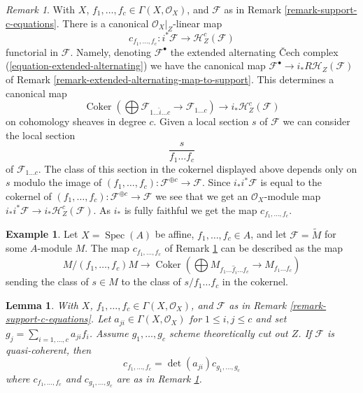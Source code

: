 \documentclass{stacks-project}
\theoremstyle{plain}
\newtheorem{lemma}[subsection]{Lemma}
\theoremstyle{definition}
\newtheorem{example}[subsection]{Example}
\theoremstyle{remark}
\newtheorem{remark}[subsection]{Remark}
\numberwithin{equation}{subsection}
\def\Spec{\mathop{\mathrm{Spec}}}
\def\Coker{\mathop{\mathrm{Coker}}}
\begin{document}
\begin{remark}
\label{remark-supported-map-c-equations}
With $X$, $f_1, \ldots, f_c \in \Gamma(X, \mathcal{O}_X)$, and
$\mathcal{F}$ as in Remark \ref{remark-support-c-equations}.
There is a canonical $\mathcal{O}_X|_Z$-linear map
$$
c_{f_1, \ldots, f_c} :
i^*\mathcal{F}
\longrightarrow
\mathcal{H}^c_Z(\mathcal{F})
$$
functorial in $\mathcal{F}$. Namely, denoting $\mathcal{F}^\bullet$ the
extended alternating {\v C}ech complex (\ref{equation-extended-alternating})
we have the canonical map
$\mathcal{F}^\bullet \to i_*R\mathcal{H}_Z(\mathcal{F})$
of Remark \ref{remark-extended-alternating-map-to-support}.
This determines a canonical map
$$
\Coker\left(\bigoplus \mathcal{F}_{1 \ldots \hat i \ldots c} \to
\mathcal{F}_{1 \ldots c}\right)
\longrightarrow
i_*\mathcal{H}^c_Z(\mathcal{F})
$$
on cohomology sheaves in degree $c$.
Given a local section $s$ of $\mathcal{F}$ we can consider the
local section
$$
\frac{s}{f_1 \ldots f_c}
$$
of $\mathcal{F}_{1 \ldots c}$. The class of this section in the cokernel
displayed above depends only on $s$ modulo the image of
$(f_1, \ldots, f_c) : \mathcal{F}^{\oplus c} \to \mathcal{F}$.
Since $i_*i^*\mathcal{F}$ is equal to the cokernel of
$(f_1, \ldots, f_c) : \mathcal{F}^{\oplus c} \to \mathcal{F}$
we see that we get an $\mathcal{O}_X$-module map
$i_*i^*\mathcal{F} \to i_*\mathcal{H}_Z^c(\mathcal{F})$.
As $i_*$ is fully faithful we get the map $c_{f_1, \ldots, f_c}$.
\end{remark}

\begin{example}
\label{example-affine-supported-map-c-equations}
Let $X = \Spec(A)$ be affine, $f_1, \ldots, f_c \in A$, and let
$\mathcal{F} = \widetilde{M}$ for some $A$-module $M$. The map
$c_{f_1, \ldots, f_c}$ of Remark \ref{remark-supported-map-c-equations}
can be described as the map
$$
M/(f_1, \ldots, f_c)M
\longrightarrow
\Coker\left(
\bigoplus M_{f_1 \ldots \hat f_i \ldots f_c} \to M_{f_1 \ldots f_c}
\right)
$$
sending the class of $s \in M$ to the class of $s/f_1 \ldots f_c$
in the cokernel.
\end{example}

\begin{lemma}
\label{lemma-supported-map-determinant}
With $X$, $f_1, \ldots, f_c \in \Gamma(X, \mathcal{O}_X)$, and
$\mathcal{F}$ as in Remark \ref{remark-support-c-equations}.
Let $a_{ji} \in \Gamma(X, \mathcal{O}_X)$ for $1 \leq i, j \leq c$
and set $g_j = \sum_{i = 1, \ldots, c} a_{ji}f_i$. Assume $g_1, \ldots, g_c$
scheme theoretically cut out $Z$. If $\mathcal{F}$ is quasi-coherent, then
$$
c_{f_1, \ldots, f_c} = \det(a_{ji}) c_{g_1, \ldots, g_c}
$$
where $c_{f_1, \ldots, f_c}$ and $c_{g_1, \ldots, g_c}$ are as in
Remark \ref{remark-supported-map-c-equations}.
\end{lemma}
\end{document}
